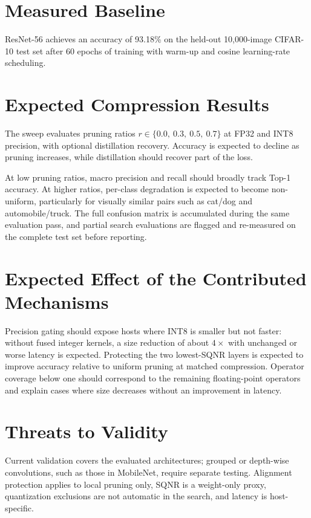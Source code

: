 \documentclass[oneside,a4paper,12pt]{report}
\begin{document}
\section{Measured Baseline}
ResNet-56 achieves an accuracy of 93.18\% on the held-out 10,000-image CIFAR-10 test set after 60 epochs of training with warm-up and cosine learning-rate scheduling.

\section{Expected Compression Results}
The sweep evaluates pruning ratios $r \in \{0.0,\ 0.3,\ 0.5,\ 0.7\}$ at FP32 and INT8 precision, with optional distillation recovery. Accuracy is expected to decline as pruning increases, while distillation should recover part of the loss.

At low pruning ratios, macro precision and recall should broadly track Top-1 accuracy. At higher ratios, per-class degradation is expected to become non-uniform, particularly for visually similar pairs such as cat/dog and automobile/truck. The full confusion matrix is accumulated during the same evaluation pass, and partial search evaluations are flagged and re-measured on the complete test set before reporting.

\section{Expected Effect of the Contributed Mechanisms}
Precision gating should expose hosts where INT8 is smaller but not faster: without fused integer kernels, a size reduction of about $4\times$ with unchanged or worse latency is expected. Protecting the two lowest-SQNR layers is expected to improve accuracy relative to uniform pruning at matched compression. Operator coverage below one should correspond to the remaining floating-point operators and explain cases where size decreases without an improvement in latency.

\section{Threats to Validity}
Current validation covers the evaluated architectures; grouped or depth-wise convolutions, such as those in MobileNet, require separate testing. Alignment protection applies to local pruning only, SQNR is a weight-only proxy, quantization exclusions are not automatic in the search, and latency is host-specific.
\end{document}
